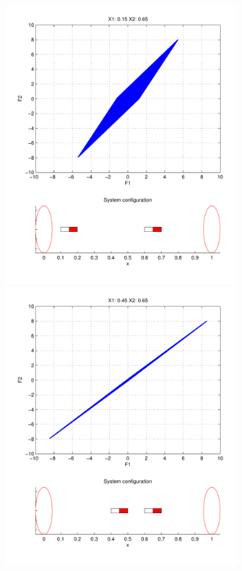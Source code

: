\documentclass[english]{article}
\begin{document}
\begin{center}
\includegraphics[width=3.5in]{figures/X115X265_Fplot.pdf}\includegraphics[width=3.5in]{figures/X145X265_Fplot.pdf}
\end{center}
\end{document}
